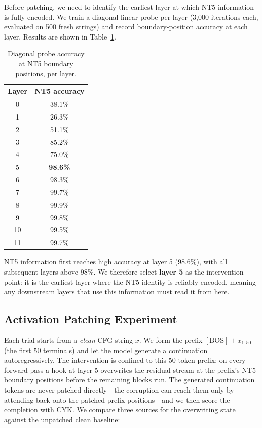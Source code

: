 \documentclass[10pt,twocolumn]{article}
\begin{document}
Before patching, we need to identify the earliest layer at which NT5 information is fully encoded. We train a diagonal linear probe per layer (3{,}000 iterations each, evaluated on 500 fresh strings) and record boundary-position accuracy at each layer. Results are shown in Table~\ref{tab:layer_probing}.

\begin{table}[h]
\centering
\caption{Diagonal probe accuracy at NT5 boundary positions, per layer.}
\label{tab:layer_probing}
\small
\begin{tabular}{cc}
\toprule
\textbf{Layer} & \textbf{NT5 accuracy} \\
\midrule
0  & 38.1\% \\
1  & 26.3\% \\
2  & 51.1\% \\
3  & 85.2\% \\
4  & 75.0\% \\
5  & \textbf{98.6\%} \\
6  & 98.3\% \\
7  & 99.7\% \\
8  & 99.9\% \\
9  & 99.8\% \\
10 & 99.5\% \\
11 & 99.7\% \\
\bottomrule
\end{tabular}
\end{table}

NT5 information first reaches high accuracy at layer 5 (98.6\%), with all subsequent layers above 98\%. We therefore select \textbf{layer 5} as the intervention point: it is the earliest layer where the NT5 identity is reliably encoded, meaning any downstream layers that use this information must read it from here.

\subsection{Activation Patching Experiment}
\label{sec:patch-exp}

Each trial starts from a \emph{clean} CFG string $x$. We form the prefix $[\mathrm{BOS}] + x_{1:50}$ (the first $50$ terminals) and let the model generate a continuation autoregressively. The intervention is confined to this $50$-token prefix: on every forward pass a hook at layer 5 overwrites the residual stream at the prefix's NT5 boundary positions before the remaining blocks run. The generated continuation tokens are never patched directly---the corruption can reach them only by attending back onto the patched prefix positions---and we then score the completion with CYK. We compare three sources for the overwriting state against the unpatched clean baseline:
\end{document}
